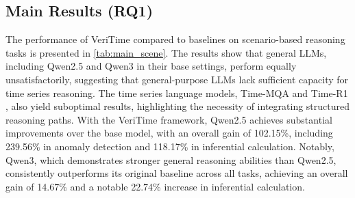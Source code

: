 \documentclass{article}
\theoremstyle{plain}
\theoremstyle{definition}
\theoremstyle{remark}
\begin{document}
\subsection{Main Results (RQ1)}

The performance of VeriTime compared to baselines on scenario-based reasoning tasks is presented in \autoref{tab:main_scene}. The results show that general LLMs, including Qwen2.5 and Qwen3 in their base settings, perform equally unsatisfactorily, suggesting that general-purpose LLMs lack sufficient capacity for time series reasoning. The time series language models, Time-MQA \cite{kong2025timeMQA} and Time-R1 \cite{luo2025timeR1}, also yield suboptimal results, highlighting the necessity of integrating structured reasoning paths. With the VeriTime framework, Qwen2.5 achieves substantial improvements over the base model, with an overall gain of 102.15\%, including 239.56\% in anomaly detection and 118.17\% in inferential calculation. Notably, Qwen3, which demonstrates stronger general reasoning abilities than Qwen2.5, consistently outperforms its original baseline across all tasks, achieving an overall gain of 14.67\% and a notable 22.74\% increase in inferential calculation. 
\end{document}
